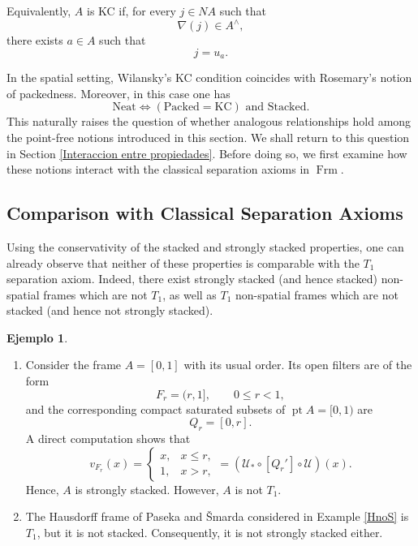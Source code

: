 \documentclass[11pt]{amsart}
\DeclareMathOperator{\pt}{pt}
\DeclareMathOperator{\Frm}{Frm}
\theoremstyle{plain}
\theoremstyle{definition}
\newtheorem{ej}[thm]{Ejemplo}
\begin{document}
Equivalently, $A$ is KC if, for every $j\in NA$ such that
\[
\nabla(j)\in A^\wedge,
\]
there exists $a\in A$ such that
\[
j=u_a.
\]

In the spatial setting, Wilansky's KC condition coincides with
Rosemary's notion of packedness. Moreover, in this case one has
\[
    \text{Neat}
    \iff (
    \text{Packed}
    =
    \text{KC}) \text{ and Stacked}.
\]
This naturally raises the question of whether analogous relationships
hold among the point-free notions introduced in this section. We shall
return to this question in Section \ref{Interaccion entre propiedades}. Before doing so, we first examine
how these notions interact with the classical separation axioms in
$\Frm$.

\subsection{Comparison with Classical Separation Axioms}\label{RelacionConPropiedadesDeSeparacion}

Using the conservativity of the stacked and strongly stacked
properties, one can already observe that neither of these
properties is comparable with the $T_1$ separation axiom. Indeed,
there exist strongly stacked (and hence stacked) non-spatial frames which are not
$T_1$, as well as $T_1$ non-spatial frames which are not stacked (and hence not
strongly stacked).

\begin{ej}\label{T1nostacked}
\mbox{}
\begin{enumerate}	
\item Consider the frame $A=[0,1]$ with its usual order. Its open filters are of the
form
\[
    F_r=(r,1], \qquad 0\leq r<1,
\]
and the corresponding compact saturated subsets of
$\pt A=[0,1)$ are
\[
    Q_r=[0,r].
\]
A direct computation shows that
\[
    v_{F_r}(x)=
    \begin{cases}
        x, & x\leq r,\\
        1, & x>r,
    \end{cases}
    =(\mathcal{U}_*\circ [Q_r']\circ \mathcal{U})(x).
\]
Hence, $A$ is strongly stacked. However, $A$ is not $T_1$.

\item The Hausdorff frame of Paseka and Šmarda \cite{PasekaSmarda1992} considered in Example \eqref{HnoS} is
$T_1$, but it is not stacked. Consequently, it is not strongly
stacked either.
\end{enumerate}
\end{ej}
\end{document}
